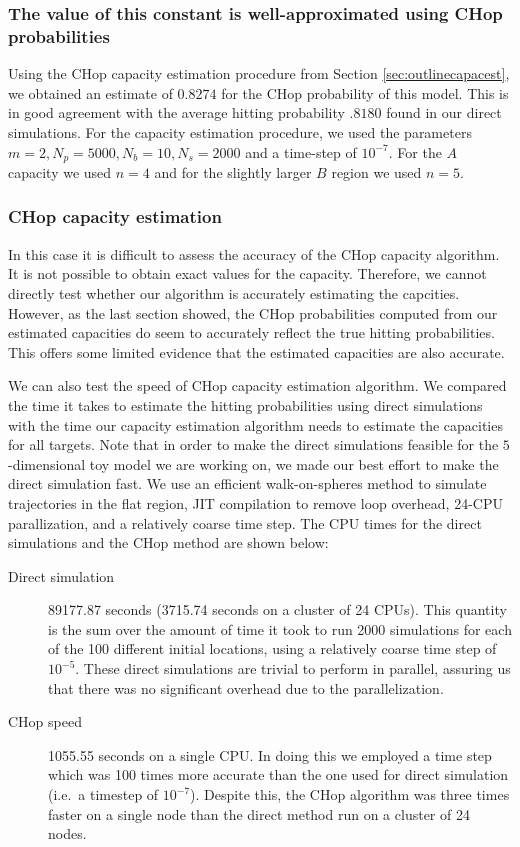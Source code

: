 \documentclass[english, aip, jcp, priprint, graphicx,floatfix]{revtex4-1}
\theoremstyle{plain}
\theoremstyle{definition}
\theoremstyle{plain}
\begin{document}
\subsubsection{The value of this constant is well-approximated using CHop probabilities}

Using the CHop capacity estimation procedure from Section \ref{sec:outlinecapacest}, we obtained an estimate of $0.8274$ for the CHop probability of this model.  This is in good agreement with the average hitting probability $.8180$ found in our direct simulations.  For the capacity estimation procedure, we used the parameters $m=2,N_p=5000,N_b=10,N_s=2000$ and a time-step of $10^{-7}$.  For the $A$ capacity we used $n=4$ and for the slightly larger $B$ region we used $n=5$.  

\subsubsection{CHop capacity estimation}

In this case it is difficult to assess the accuracy of the CHop capacity algorithm.  It is not possible to obtain exact values for the capacity.  Therefore, we cannot directly test whether our algorithm is accurately estimating the capcities.  However, as the last section showed, the CHop probabilities computed from our estimated capacities do seem to accurately reflect the true hitting probabilities.  This offers some limited evidence that the estimated capacities are also accurate.

We can also test the speed of CHop capacity estimation algorithm.  We compared the time it takes to estimate the hitting probabilities using direct simulations with the time our capacity estimation algorithm needs to estimate the capacities for all targets. Note that in order to make the direct simulations feasible for the $5$-dimensional toy model we are working on, we made our best effort to make the direct simulation fast.  We use an efficient walk-on-spheres method to simulate trajectories in the flat region,\cite{bingham1972random} JIT compilation to remove loop overhead, 24-CPU parallization, and a relatively coarse time step.  The CPU times for the direct simulations and the CHop method are shown below:

\begin{description}
\item[Direct simulation] 89177.87 seconds (3715.74 seconds on a cluster of 24 CPUs).  This quantity is the sum over the amount of time it took to run 2000 simulations for each of the 100 different initial locations, using a relatively coarse time step of $10^{-5}$.  These direct simulations are trivial to perform in parallel, assuring us that there was no significant overhead due to the parallelization.

\item[CHop speed] 1055.55 seconds on a single CPU. In doing this we employed a time step which was 100 times more accurate than the one used for direct simulation (i.e.\ a timestep of $10^{-7}$). Despite this, the CHop algorithm was three times faster on a single node than the direct method run on a cluster of 24 nodes.

\end{description}
\end{document}
